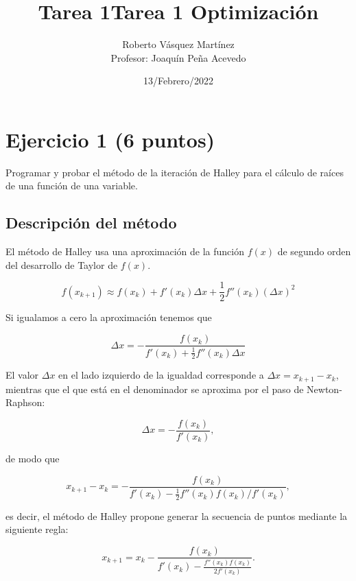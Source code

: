 \documentclass[11pt]{article}
\title{Tarea 1}
\begin{document}
    \title{Tarea 1 Optimización}
    \author{Roberto Vásquez Martínez \\ Profesor: Joaquín Peña Acevedo}
    \date{13/Febrero/2022}
    \maketitle
    
    

    
    \hypertarget{ejercicio-1-6-puntos}{%
\section{Ejercicio 1 (6 puntos)}\label{ejercicio-1-6-puntos}}

Programar y probar el método de la iteración de Halley para el cálculo
de raíces de una función de una variable.

\hypertarget{descripciuxf3n-del-muxe9todo}{%
\subsection{Descripción del
método}\label{descripciuxf3n-del-muxe9todo}}

El método de Halley usa una aproximación de la función \(f(x)\) de
segundo orden del desarrollo de Taylor de \(f(x)\).

\[ f(x_{k+1}) \approx f(x_k) +  f'(x_k) \Delta x + \frac{1}{2} f''(x_k) (\Delta x)^2 \]

Si igualamos a cero la aproximación tenemos que

\[
\Delta x = - \frac{f(x_k)}{  f'(x_k) + \frac{1}{2} f''(x_k) \Delta x }
\]

El valor \(\Delta x\) en el lado izquierdo de la igualdad corresponde a
\(\Delta x = x_{k+1} - x_{k}\), mientras que el que está en el
denominador se aproxima por el paso de Newton-Raphson:

\[ \Delta x = -\frac{f(x_k)}{f'(x_k)}, \]

de modo que

\[
x_{k+1} - x_{k} = 
- \frac{f(x_k)}{  f'(x_k) - \frac{1}{2} f''(x_k)f(x_k)/f'(x_k)  },
\]

es decir, el método de Halley propone generar la secuencia de puntos
mediante la siguiente regla:

\[
x_{k+1} = x_{k} 
- \frac{f(x_k)}{  f'(x_k) - \frac{f''(x_k)f(x_k)}{2f'(x_k)}  }.
\]
\end{document}
